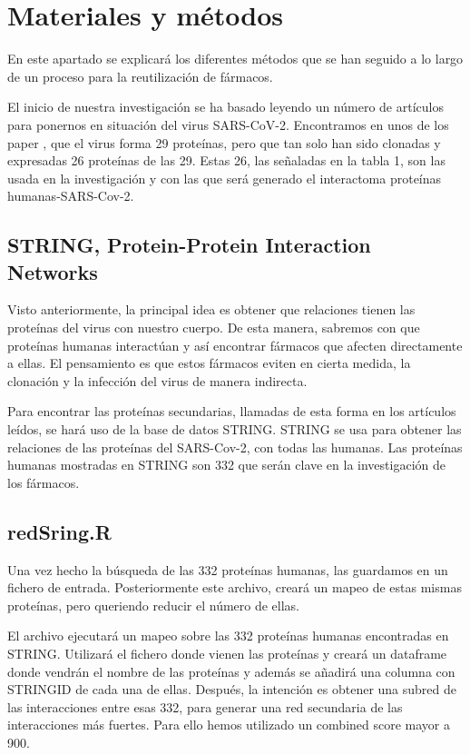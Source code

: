 \section{Materiales y métodos}

En este apartado se explicará los diferentes métodos que se han seguido a lo largo de un proceso para la reutilización de fármacos.

El inicio de nuestra investigación se ha basado leyendo un número de artículos para ponernos en situación del virus SARS-CoV-2. Encontramos en unos de los paper \cite{Gordon2020}, que el virus forma 29 proteínas, pero que tan solo han sido clonadas y expresadas 26 proteínas de las 29.  Estas 26, las señaladas en la tabla 1, son las usada en la investigación y con las que será generado el interactoma proteínas humanas-SARS-Cov-2. 


\subsection{STRING, Protein-Protein Interaction Networks}

Visto anteriormente, la principal idea es obtener que relaciones tienen las proteínas del virus con nuestro cuerpo. De esta manera, sabremos con que proteínas humanas interactúan y así encontrar fármacos que afecten directamente a ellas. El pensamiento es que estos fármacos eviten en cierta medida, la clonación y la infección del virus de manera indirecta. 

Para encontrar las proteínas secundarias, llamadas de esta forma en los artículos leídos, se hará uso de la base de datos STRING. 
STRING se usa para obtener las relaciones de las proteínas del SARS-Cov-2, con todas las humanas. Las proteínas humanas mostradas en STRING son 332 que serán clave en la investigación de los fármacos. 

\subsection{redSring.R}

Una vez hecho la búsqueda de las 332 proteínas humanas, las guardamos en un fichero de entrada. Posteriormente este archivo, creará un mapeo de estas mismas proteínas, pero queriendo reducir el número de ellas. 

El archivo ejecutará un mapeo sobre las 332 proteínas humanas encontradas en STRING. Utilizará el fichero donde vienen las proteínas y creará un dataframe donde vendrán el nombre de las proteínas y además se añadirá una columna con STRINGID de cada una de ellas. Después, la intención es obtener una subred de las interacciones entre esas 332, para generar una red secundaria de las interacciones más fuertes. Para ello hemos utilizado un combined score mayor a 900. 


